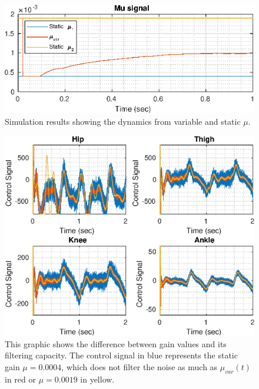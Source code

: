 \documentclass[letterpaper, 10 pt, journal, twocolumn]{IEEEtran}  %
\theoremstyle{plain}
\theoremstyle{definition}
\theoremstyle{remark}
\begin{document}
%
\begin{figure}[h!]
	\begin{center}
	\includegraphics[width = \columnwidth]{Figs/mu_comparison.eps}
	\caption{Simulation results showing the dynamics from variable and static $\mu$.}
	\label{fig:mu_comparison}
	\end{center}
\end{figure}
%
%
\begin{figure}[h!]
	\begin{center}
	\includegraphics[width = \columnwidth]{Figs/u_comparison.eps}
	\caption{This graphic shows the difference between gain values and its filtering capacity. The control signal in blue represents the static gain $\mu = 0.0004$, which does not filter the noise as much as $\mu_{var}(t)$ in red or $\mu = 0.0019$ in yellow.}
	\label{fig:u_comparison}
	\end{center}
\end{figure}
%
%
\end{document}
